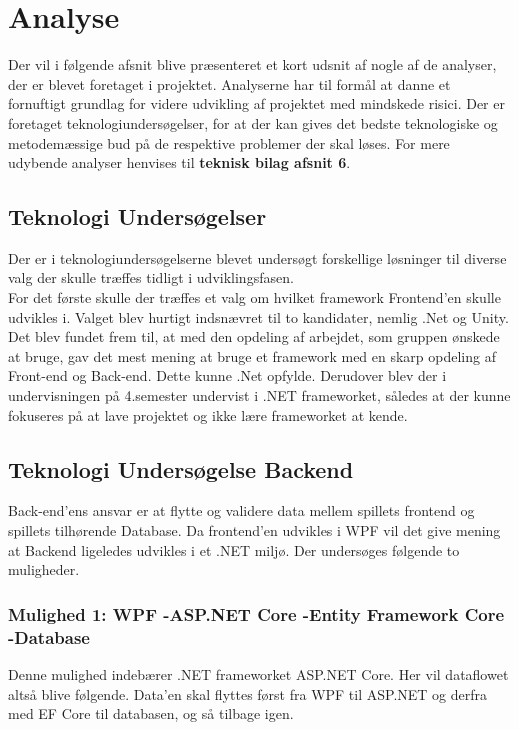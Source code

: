 \section{Analyse}
Der vil i følgende afsnit blive præsenteret et kort udsnit af nogle af de analyser, der er blevet foretaget i projektet. Analyserne har til formål at danne et fornuftigt grundlag for videre udvikling af
projektet med mindskede risici. Der er foretaget teknologiundersøgelser, for at der kan gives det bedste teknologiske og metodemæssige bud på de respektive problemer der skal løses. For mere udybende analyser henvises til \textbf{teknisk bilag afsnit 6}.

\subsection{Teknologi Undersøgelser}
Der er i teknologiundersøgelserne blevet undersøgt forskellige løsninger til diverse valg der skulle træffes tidligt i udviklingsfasen.\\
For det første skulle der træffes et valg om hvilket framework Frontend'en skulle udvikles i. Valget blev hurtigt indsnævret til to kandidater, nemlig .Net og Unity. Det blev fundet frem til, at med den 
opdeling af arbejdet, som gruppen ønskede at bruge, gav det mest mening at bruge et framework med en skarp opdeling af Front-end og Back-end. 
Dette kunne .Net opfylde. Derudover blev der i undervisningen på 4.semester undervist i .NET frameworket, således at der kunne fokuseres på at lave projektet og ikke lære frameworket at kende. 


\subsection{Teknologi Undersøgelse Backend}
Back-end’ens ansvar er at flytte og validere data mellem spillets frontend og spillets tilhørende Database. Da frontend'en udvikles i WPF vil det give mening at Backend ligeledes udvikles i et .NET miljø.
Der undersøges følgende to muligheder.\\

\subsubsection{Mulighed 1: WPF -\g ASP.NET Core -\g Entity Framework Core -\g Database}
Denne mulighed indebærer .NET frameworket ASP.NET Core. Her vil dataflowet altså blive følgende. Data’en skal flyttes først fra WPF til ASP.NET og derfra med EF Core\cite{Entity-Framework-Core} til databasen, og så tilbage igen.

